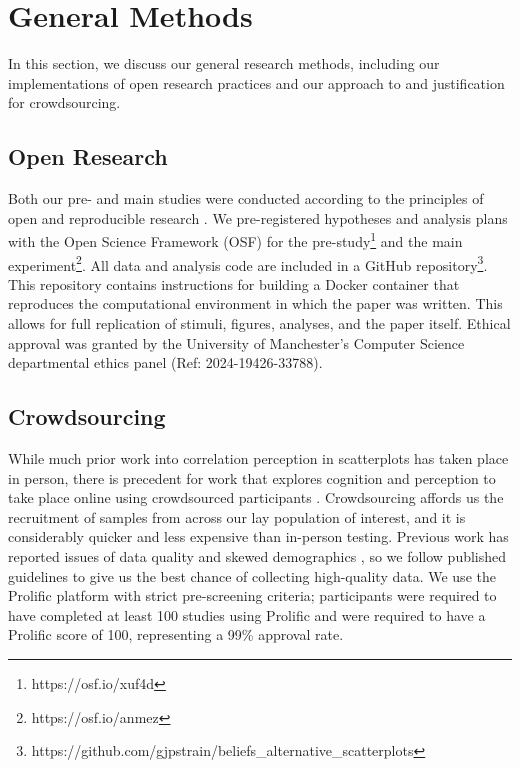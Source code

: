 \documentclass[sigconf]{acmart}
\begin{document}
\section{General Methods}\label{sec-general-methods}

In this section, we discuss our general research methods, including our
implementations of open research practices and our approach to and
justification for crowdsourcing.

\subsection{Open Research}\label{sec-open-research}

Both our pre- and main studies were conducted according to the
principles of open and reproducible research \citep{ayris_2018}. We
pre-registered hypotheses and analysis plans with the Open Science
Framework (OSF) for the pre-study\footnote{https://osf.io/xuf4d} and the
main experiment\footnote{https://osf.io/anmez}. All data and analysis
code are included in a GitHub repository\footnote{https://github.com/gjpstrain/beliefs\_alternative\_scatterplots}.
This repository contains instructions for building a Docker container
\citep{merkel_2014} that reproduces the computational environment in
which the paper was written. This allows for full replication of
stimuli, figures, analyses, and the paper itself. Ethical approval was
granted by the University of Manchester's Computer Science departmental
ethics panel (Ref: 2024-19426-33788).

\subsection{Crowdsourcing}\label{sec-crowdsourcing}

While much prior work into correlation perception in scatterplots has
taken place in person, there is precedent for work that explores
cognition and perception to take place online using crowdsourced
participants \citep{xiong_2022}. Crowdsourcing affords us the
recruitment of samples from across our lay population of interest, and
it is considerably quicker and less expensive than in-person testing.
Previous work has reported issues of data quality and skewed
demographics \citep{chmielewski_2020, charalambides_2021, peer_2021}, so
we follow published guidelines \citep{peer_2021} to give us the best
chance of collecting high-quality data. We use the Prolific platform
\citep{prolific} with strict pre-screening criteria; participants were
required to have completed at least 100 studies using Prolific and were
required to have a Prolific score of 100, representing a 99\% approval
rate.
\end{document}
